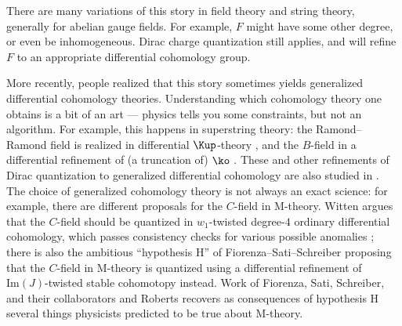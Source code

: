 \begin{remark}
	There are many variations of this story in field theory and string theory, generally for abelian gauge fields.
	For example, $F$ might have some other degree, or even be inhomogeneous. Dirac charge quantization still
	applies, and will refine $F$ to an appropriate differential cohomology group.

	More recently, people realized that this story sometimes yields generalized differential cohomology theories.
	Understanding which cohomology theory one obtains is a bit of an art --- physics tells you some constraints,
	but not an algorithm. For example, this happens in superstring theory: the Ramond--Ramond
	field is realized in differential $\Kup$-theory \cite{FH00,
	MW00}, and the $B$-field in a differential
	refinement of (a truncation of) $\ko$ \cite{DFM11a, DFM11b}. These and other refinements of Dirac
	quantization to generalized differential cohomology are also studied in \cite{BM06a, BM06b, DFM07, Fre08,
	Sat10, SZ10, Sat11, SSS12, KM13, KV14, DMDR14, FSS15, FR16, GS19, Sat19, FRRB20}. The choice of generalized
	cohomology theory is not always an exact science: for example, there are different proposals for the $C$-field
	in M-theory. Witten \cite[\S 2.3]{Wit97} argues that the $C$-field should be quantized in $w_1$-twisted
	degree-$4$ ordinary differential cohomology, which passes consistency checks for various possible
	anomalies \cites[\S 4]{Wit97}[\S 4]{Wit16}{FH21a}; there is also the ambitious ``hypothesis H'' of
	Fiorenza--Sati--Schreiber \cite{Sat18, FSS19, FSS20a} proposing that the $C$-field in M-theory is quantized
	using a differential refinement of $\mathrm{Im}(J)$-twisted stable cohomotopy instead. Work of Fiorenza, Sati,
	Schreiber, and their collaborators \cite{FSS19, SS19, FSS20a, FSS20b, FSS20c, GS20, SS20b, SS20a, SS20c, BSS21,
	SS21} and Roberts \cite{Rob20} recovers as consequences of hypothesis H several things physicists predicted to
	be true about M-theory.
\end{remark}

